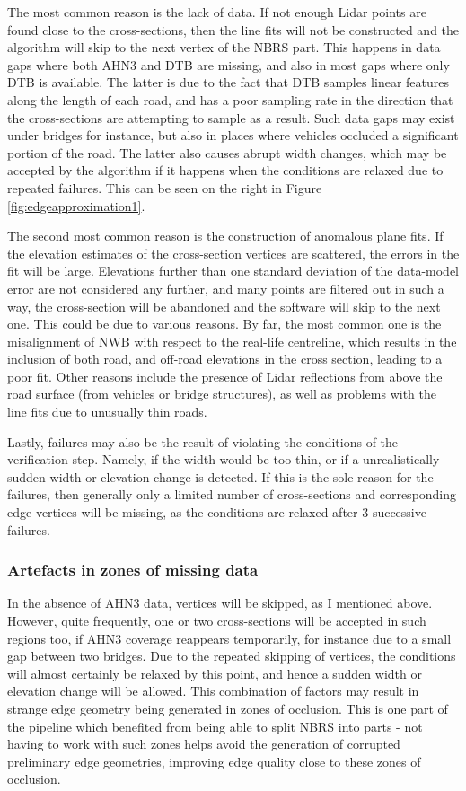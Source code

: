 The most common reason is the lack of data. If not enough Lidar points are found close to the cross-sections, then the line fits will not be constructed and the algorithm will skip to the next vertex of the NBRS part. This happens in data gaps where both AHN3 and DTB are missing, and also in most gaps where only DTB is available. The latter is due to the fact that DTB samples linear features along the length of each road, and has a poor sampling rate in the direction that the cross-sections are attempting to sample as a result. Such data gaps may exist under bridges for instance, but also in places where vehicles occluded a significant portion of the road. The latter also causes abrupt width changes, which may be accepted by the algorithm if it happens when the conditions are relaxed due to repeated failures. This can be seen on the right in Figure \ref{fig:edgeapproximation1}.

The second most common reason is the construction of anomalous plane fits. If the elevation estimates of the cross-section vertices are scattered, the errors in the fit will be large. Elevations further than one standard deviation of the data-model error are not considered any further, and many points are filtered out in such a way, the cross-section will be abandoned and the software will skip to the next one. This could be due to various reasons. By far, the most common one is the misalignment of NWB with respect to the real-life centreline, which results in the inclusion of both road, and off-road elevations in the cross section, leading to a poor fit. Other reasons include the presence of Lidar reflections from above the road surface (from vehicles or bridge structures), as well as problems with the line fits due to unusually thin roads.

Lastly, failures may also be the result of violating the conditions of the verification step. Namely, if the width would be too thin, or if a unrealistically sudden width or elevation change is detected. If this is the sole reason for the failures, then generally only a limited number of cross-sections and corresponding edge vertices will be missing, as the conditions are relaxed after 3 successive failures.

\subsubsection{Artefacts in zones of missing data}

In the absence of AHN3 data, vertices will be skipped, as I mentioned above. However, quite frequently, one or two cross-sections will be accepted in such regions too, if AHN3 coverage reappears temporarily, for instance due to a small gap between two bridges. Due to the repeated skipping of vertices, the conditions will almost certainly be relaxed by this point, and hence a sudden width or elevation change will be allowed. This combination of factors may result in strange edge geometry being generated in zones of occlusion. This is one part of the pipeline which benefited from being able to split NBRS into parts - not having to work with such zones helps avoid the generation of corrupted preliminary edge geometries, improving edge quality close to these zones of occlusion.

